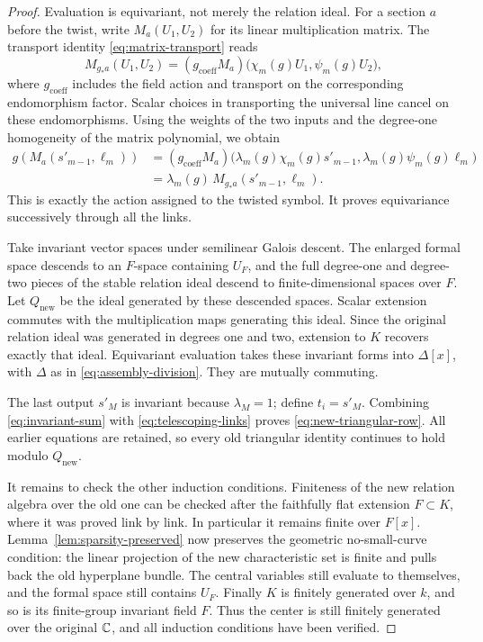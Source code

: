 \begin{proof}
Evaluation is equivariant, not merely the relation ideal.
For a section \(a\) before the twist, write
\(M_a(U_1,U_2)\) for its linear multiplication matrix.
The transport identity \eqref{eq:matrix-transport} reads
\[
 M_{g_*a}(U_1,U_2)
 =(g_{\mathrm{coeff}}M_a)
      \bigl(\chi_m(g)U_1,\psi_m(g)U_2\bigr),
\]
where \(g_{\mathrm{coeff}}\) includes the field action and transport on
the corresponding endomorphism factor.
Scalar choices in transporting the universal line cancel on these
endomorphisms.
Using the weights of the two inputs and the degree-one homogeneity of
the matrix polynomial, we obtain
\begin{align*}
 g\!\left(M_a(s'_{m-1},\ell_m)\right)
 &=(g_{\mathrm{coeff}}M_a)
       \bigl(\lambda_m(g)\chi_m(g)s'_{m-1},
             \lambda_m(g)\psi_m(g)\ell_m\bigr)\\
 &=\lambda_m(g)\,M_{g_*a}(s'_{m-1},\ell_m).
\end{align*}
This is exactly the action assigned to the twisted symbol.
It proves equivariance successively through all the links.

Take invariant vector spaces under semilinear Galois descent.
The enlarged formal space descends to an \(F\)-space containing \(U_F\),
and the full degree-one and degree-two pieces of the stable relation
ideal descend to finite-dimensional spaces over \(F\). Let
\(Q_{\mathrm{new}}\) be the ideal generated by these descended spaces.
Scalar extension commutes with the multiplication maps generating this
ideal. Since the original relation ideal was generated in degrees one
and two, extension to \(K\) recovers exactly that ideal.
Equivariant evaluation takes these invariant forms into
\(\Delta[x]\), with \(\Delta\) as in \eqref{eq:assembly-division}.
They are mutually commuting.

The last output \(s'_M\) is invariant because \(\lambda_M=1\); define
\(t_i=s'_M\).
Combining \eqref{eq:invariant-sum} with
\eqref{eq:telescoping-links} proves \eqref{eq:new-triangular-row}.
All earlier equations are retained, so every old triangular identity
continues to hold modulo \(Q_{\mathrm{new}}\).

It remains to check the other induction conditions.
Finiteness of the new relation algebra over the old one can be checked
after the faithfully flat extension \(F\subset K\), where it was proved
link by link.  In particular it remains finite over \(F[x]\).
Lemma~\ref{lem:sparsity-preserved} now preserves the geometric
no-small-curve condition: the linear projection of the new
characteristic set is finite and pulls back the old hyperplane bundle.
The central variables still evaluate to themselves, and the formal space
still contains \(U_F\).
Finally \(K\) is finitely generated over \(k\), and so is its finite-group
invariant field \(F\).
Thus the center is still finitely generated over the original
\(\mathbb C\), and all induction conditions have been verified.
\end{proof}

